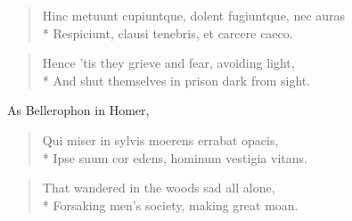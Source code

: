{\begin{latin}
\begin{verse}%
Hinc metuunt cupiuntque, dolent fugiuntque, nec auras\\*
Respiciunt, clausi tenebris, et carcere caeco.
\end{verse}%
\end{latin}
\translationrule%
\begin{verse}%
Hence 'tis they grieve and fear, avoiding light,\\*
And shut themselves in prison dark from sight.
\end{verse}%

As Bellerophon in Homer,

\begin{latin}
\begin{verse}%
Qui miser in sylvis moerens errabat opacis,\\*
Ipse suum cor edens, hominum vestigia vitans.
\end{verse}%
\end{latin}
\translationrule%
\begin{verse}%
That wandered in the woods sad all alone,\\*
Forsaking men's society, making great moan.
\end{verse}%

}

